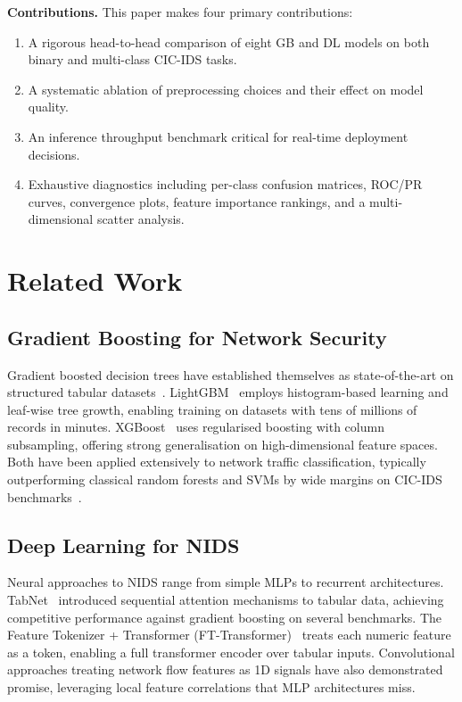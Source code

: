 \documentclass[conference]{IEEEtran}
\begin{document}
\textbf{Contributions.}  This paper makes four primary contributions:
\begin{enumerate}[leftmargin=*,label=(\arabic*)]
  \item A rigorous head-to-head comparison of eight GB and DL models on both
        binary and multi-class CIC-IDS tasks.
  \item A systematic ablation of preprocessing choices and their effect on
        model quality.
  \item An inference throughput benchmark critical for real-time deployment
        decisions.
  \item Exhaustive diagnostics including per-class confusion matrices, ROC/PR
        curves, convergence plots, feature importance rankings, and a
        multi-dimensional scatter analysis.
\end{enumerate}

\section{Related Work}

\subsection{Gradient Boosting for Network Security}

Gradient boosted decision trees have established themselves as
state-of-the-art on structured tabular datasets~\cite{chen2016xgboost}.
LightGBM~\cite{ke2017lightgbm} employs histogram-based learning and leaf-wise
tree growth, enabling training on datasets with tens of millions of records
in minutes.  XGBoost~\cite{chen2016xgboost} uses regularised boosting with
column subsampling, offering strong generalisation on high-dimensional feature
spaces.  Both have been applied extensively to network traffic classification,
typically outperforming classical random forests and SVMs by wide margins on
CIC-IDS benchmarks~\cite{panigrahi2018}.

\subsection{Deep Learning for NIDS}

Neural approaches to NIDS range from simple MLPs to recurrent architectures.
TabNet~\cite{arik2021tabnet} introduced sequential attention mechanisms to
tabular data, achieving competitive performance against gradient boosting on
several benchmarks.  The Feature Tokenizer + Transformer
(FT-Transformer)~\cite{gorishniy2021} treats each numeric feature as a token,
enabling a full transformer encoder over tabular inputs.  Convolutional
approaches treating network flow features as 1D signals have also demonstrated
promise, leveraging local feature correlations that MLP architectures miss.
\end{document}
